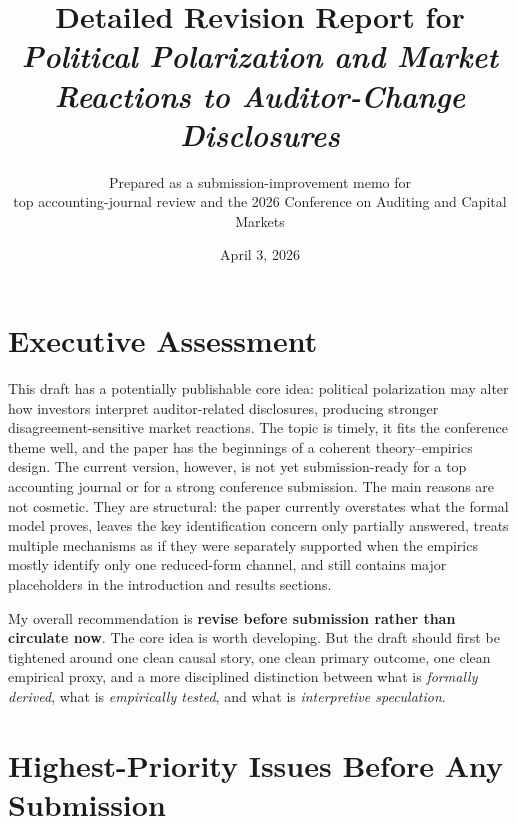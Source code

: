 \documentclass[12pt]{article}
\title{Detailed Revision Report for\\\textit{Political Polarization and Market Reactions to Auditor-Change Disclosures}}
\author{Prepared as a submission-improvement memo for\\top accounting-journal review and the 2026 Conference on Auditing and Capital Markets}
\date{April 3, 2026}
\begin{document}
\maketitle

\section*{Executive Assessment}

This draft has a potentially publishable core idea: political polarization may alter how investors interpret auditor-related disclosures, producing stronger disagreement-sensitive market reactions. The topic is timely, it fits the conference theme well, and the paper has the beginnings of a coherent theory--empirics design. The current version, however, is not yet submission-ready for a top accounting journal or for a strong conference submission. The main reasons are not cosmetic. They are structural: the paper currently overstates what the formal model proves, leaves the key identification concern only partially answered, treats multiple mechanisms as if they were separately supported when the empirics mostly identify only one reduced-form channel, and still contains major placeholders in the introduction and results sections.

My overall recommendation is \textbf{revise before submission rather than circulate now}. The core idea is worth developing. But the draft should first be tightened around one clean causal story, one clean primary outcome, one clean empirical proxy, and a more disciplined distinction between what is \emph{formally derived}, what is \emph{empirically tested}, and what is \emph{interpretive speculation}.

\section*{Highest-Priority Issues Before Any Submission}
\end{document}
